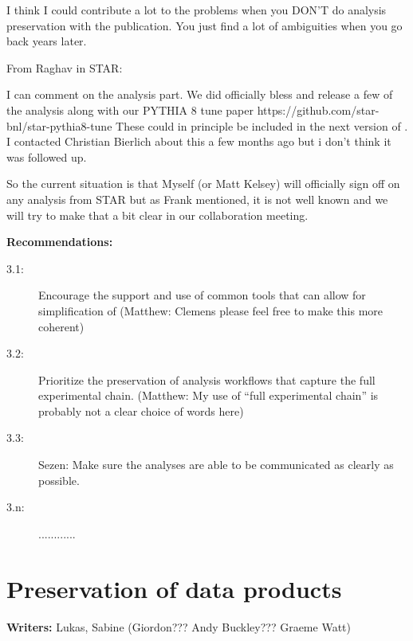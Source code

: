 \documentclass[11pt]{article}
\begin{document}
{I think I could contribute a lot to the problems when you DON'T do analysis preservation with the publication.  You just find a lot of ambiguities when you go back years later.

\hrulex

From Raghav in STAR:

I can comment on the analysis part. We did officially bless and release a few of the analysis along with our PYTHIA 8 tune paper https://github.com/star-bnl/star-pythia8-tune 
These could in principle be included in the next version of \rivet. I contacted Christian Bierlich about this a few months ago but i don’t think it was followed up. 

So the current situation is that Myself (or Matt Kelsey) will officially sign off on any \rivet analysis from STAR but as Frank mentioned, it is not well known and we will try to make that a bit clear in our collaboration meeting. 
}


\noindent
\textbf{Recommendations:}
\begin{description}
   \item[3.1:] Encourage the support and use of common tools that can allow for simplification of (Matthew: Clemens please feel free to make this more coherent)
   \item[3.2:] Prioritize the preservation of analysis workflows that capture the full experimental chain. (Matthew: My use of ``full experimental chain'' is probably not a clear choice of words here)
   \item[3.3:] Sezen: Make sure the analyses are able to be communicated as clearly as possible.
   \item[3.n:] ............  
\end{description}


\section{Preservation of data products}

\noindent\textbf{Writers:} Lukas, Sabine (Giordon??? Andy Buckley??? Graeme Watt) \\
\end{document}
